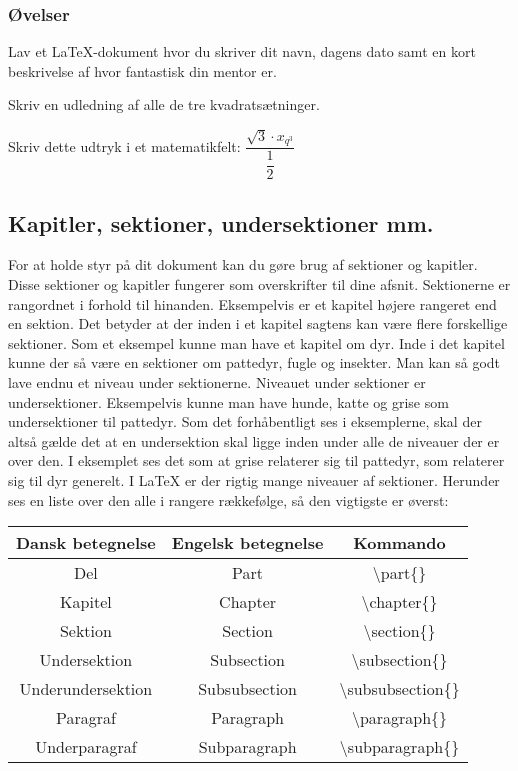 \documentclass[titlepage]{article}
\begin{document}
\subsubsection{Øvelser}
\begin{opg}
Lav et \LaTeX{-dokument} hvor du skriver dit navn, dagens dato samt en kort beskrivelse af hvor fantastisk din mentor er. 
\end{opg}

\begin{opg}
Skriv en udledning af alle de tre kvadratsætninger.
\end{opg}

\begin{opg}
Skriv dette udtryk i et matematikfelt: $\dfrac{\sqrt{3} \cdot  x_{q^3}}{\dfrac{1}{2}}$
\end{opg}

\subsection{Kapitler, sektioner, undersektioner mm.}
For at holde styr på dit dokument kan du gøre brug af sektioner og kapitler. 
Disse sektioner og kapitler fungerer som overskrifter til dine afsnit. 
Sektionerne er rangordnet i forhold til hinanden. 
Eksempelvis er et kapitel højere rangeret end en sektion.
Det betyder at der inden i et kapitel sagtens kan være flere forskellige sektioner.
Som et eksempel kunne man have et kapitel om dyr.
Inde i det kapitel kunne der så være en sektioner om pattedyr, fugle og insekter.
Man kan så godt lave endnu et niveau under sektionerne. 
Niveauet under sektioner er undersektioner.
Eksempelvis kunne man have hunde, katte og grise som undersektioner til pattedyr.
Som det forhåbentligt ses i eksemplerne, skal der altså gælde det at en undersektion skal ligge inden under alle de niveauer der er over den. 
I eksemplet ses det som at grise relaterer sig til pattedyr, som relaterer sig til dyr generelt.
I \LaTeX{} er der rigtig mange niveauer af sektioner.
Herunder ses en liste over den alle i rangere rækkefølge, så den vigtigste er øverst:
\bigbreak


\begin{center}
\begin{tabular}{|c|c|c|}
	\hline \textbf{Dansk betegnelse} & \textbf{Engelsk betegnelse} & \textbf{Kommando}\\ \hline
	Del & Part & \textbackslash part\{\} \\ \hline
	Kapitel & Chapter & \textbackslash chapter\{\} \\ \hline
	Sektion & Section & \textbackslash section\{\} \\ \hline
	Undersektion & Subsection & \textbackslash subsection\{\} \\ \hline
	Underundersektion & Subsubsection & \textbackslash subsubsection\{\} \\ \hline
	Paragraf & Paragraph & \textbackslash paragraph\{\} \\ \hline
	Underparagraf & Subparagraph & \textbackslash subparagraph\{\} \\ \hline
\end{tabular}
\end{center}
\end{document}

